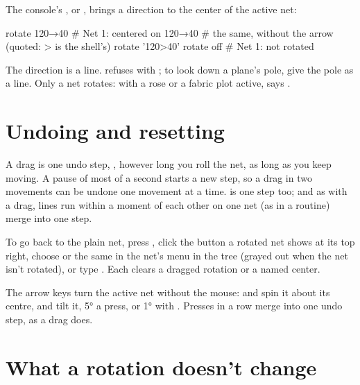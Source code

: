The console's , or , brings a direction to the center of
the active net:

\begin{codeblock}
rotate 120→40      # Net 1: centered on 120→40
# the same, without the arrow (quoted: > is the shell's)
rotate '120>40'
rotate off         # Net 1: not rotated
\end{codeblock}

The direction is a line.  refuses with ; to look down a plane's pole, give the pole as a line. Only a net rotates: with a rose or a
fabric plot active,  says .


\section{Undoing and resetting}\label{sec:rotate-reset}

A drag is one undo step, , however long you roll the net, as long as you keep
moving. A pause of most of a second starts a new step, so a drag in two movements can be undone one movement
at a time.  is one step too; and as with a drag,  lines run within a moment
of each other on one net (as in a routine) merge into one step.

To go back to the plain net, press , click the  button a rotated net shows at its
top right, choose  or the same in the net's menu in the tree
(grayed out when the net isn't rotated), or type . Each clears a dragged rotation or a named
center.

The arrow keys turn the active net without the mouse:  and  spin it about its centre,
 and  tilt it, 5° a press, or 1° with . Presses in a row merge into one undo step,
as a drag does.

\section{What a rotation doesn't change}\label{sec:rotation-true}

